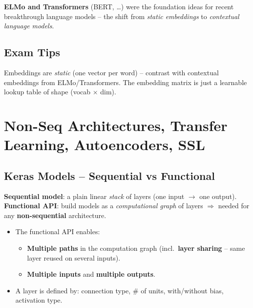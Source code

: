 \documentclass[10pt,a4paper]{article}
\begin{document}
	\begin{importantbox}
		\textbf{ELMo and Transformers} (BERT, \dots) were the foundation ideas for recent breakthrough language models -- the shift from \emph{static embeddings} to \emph{contextual language models}.
	\end{importantbox}

	\subsection{Exam Tips}

	\begin{examtipbox}
		Embeddings are \emph{static} (one vector per word) -- contrast with contextual embeddings from ELMo/Transformers. The embedding matrix is just a learnable lookup table of shape (vocab $\times$ dim).
	\end{examtipbox}
	
	\section{Non-Seq Architectures, Transfer Learning, Autoencoders, SSL}

	\subsection{Keras Models -- Sequential vs Functional}

	\begin{definitionbox}
		\textbf{Sequential model}: a plain linear \emph{stack} of layers (one input $\to$ one output). \\
		\textbf{Functional API}: build models as a \emph{computational graph} of layers $\Rightarrow$ needed for any \textbf{non-sequential} architecture.
	\end{definitionbox}

	\begin{itemize}[leftmargin=*]
		\item The functional API enables:
		\begin{itemize}
			\item \textbf{Multiple paths} in the computation graph (incl.\ \textbf{layer sharing} -- same layer reused on several inputs).
			\item \textbf{Multiple inputs} and \textbf{multiple outputs}.
		\end{itemize}
		\item A layer is defined by: connection type, \# of units, with/without bias, activation type.
	\end{itemize}
\end{document}
